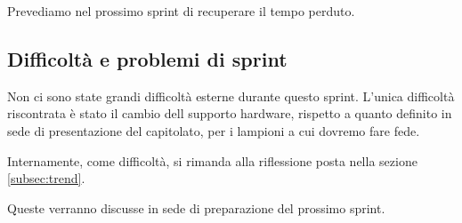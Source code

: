 Prevediamo nel prossimo sprint di recuperare il tempo perduto.

\subsection{Difficoltà e problemi di sprint}

Non ci sono state grandi difficoltà esterne durante questo sprint. L'unica difficoltà riscontrata è stato il cambio dell supporto hardware, rispetto a quanto definito in sede di presentazione del capitolato, per i lampioni a cui dovremo fare fede.

Internamente, come difficoltà, si rimanda alla riflessione posta nella sezione \ref{subsec:trend}.

Queste verranno discusse in sede di preparazione del prossimo sprint.
